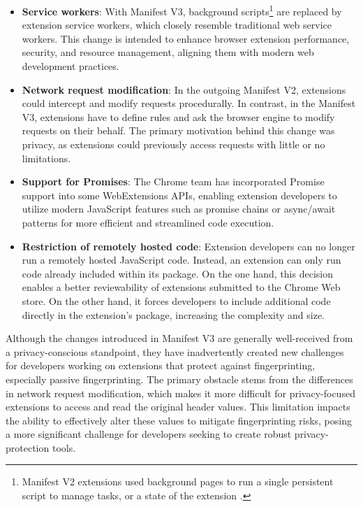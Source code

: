 \begin{itemize}
	\item \textbf{Service workers}: With Manifest V3, background scripts\footnote{Manifest V2 extensions used background pages to run a single persistent script to manage tasks, or a state of the extension \cite{ChromeManifestV2}.} are replaced by extension service workers, which closely resemble traditional web service workers. This change is intended to enhance browser extension performance, security, and resource management, aligning them with modern web development practices.
	\item \textbf{Network request modification}: In the outgoing Manifest V2, extensions could intercept and modify requests procedurally. In contrast, in the Manifest V3, extensions have to define rules and ask the browser engine to modify requests on their behalf. The primary motivation behind this change was privacy, as extensions could previously access requests with little or no limitations.
	\item \textbf{Support for Promises}: The Chrome team has incorporated Promise support into some WebExtensions APIs, enabling extension developers to utilize modern JavaScript features such as promise chains or async/await patterns for more efficient and streamlined code execution.
	\item \textbf{Restriction of remotely hosted code}: Extension developers can no longer run a remotely hosted JavaScript code. Instead, an extension can only run code already included within its package. On the one hand, this decision enables a better reviewability of extensions submitted to the Chrome Web store. On the other hand, it forces developers to include additional code directly in the extension's package, increasing the complexity and size.
\end{itemize}

Although the changes introduced in Manifest V3 are generally well-received from a privacy-conscious standpoint, they have inadvertently created new challenges for developers working on extensions that protect against fingerprinting, especially passive fingerprinting. The primary obstacle stems from the differences in network request modification, which makes it more difficult for privacy-focused extensions to access and read the original header values. This limitation impacts the ability to effectively alter these values to mitigate fingerprinting risks, posing a more significant challenge for developers seeking to create robust privacy-protection tools.

